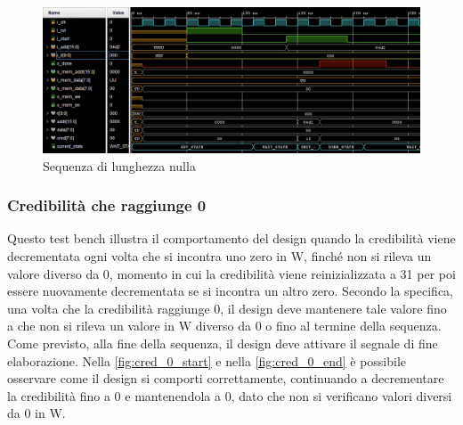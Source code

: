 \documentclass[11pt,a4paper]{article}
\newcommand{\m}[1]{{\fontfamily{zi4}\selectfont #1}}
\begin{document}
\vspace{0.5em}
\begin{figure}[htbp]
    \centering
    \includegraphics[width=\textwidth]{resources/empty_sequence.png}
    \caption{Sequenza di lunghezza nulla}
    \label{fig:empty_sequence}
\end{figure}

\subsubsection{Credibilità che raggiunge 0}
Questo test bench illustra il comportamento del design quando la credibilità viene decrementata ogni volta che si incontra uno zero in \m{W}, finché non si rileva un valore diverso da 0, momento in cui la credibilità viene reinizializzata a 31 per poi essere nuovamente decrementata se si incontra un altro zero. Secondo la specifica, una volta che la credibilità raggiunge 0, il design deve mantenere tale valore fino a che non si rileva un valore in \m{W} diverso da 0 o fino al termine della sequenza. Come previsto, alla fine della sequenza, il design deve attivare il segnale di fine elaborazione. Nella \autoref{fig:cred_0_start} e nella \autoref{fig:cred_0_end} è possibile osservare come il design si comporti correttamente, continuando a decrementare la credibilità fino a 0 e mantenendola a 0, dato che non si verificano valori diversi da 0 in \m{W}.
\end{document}
